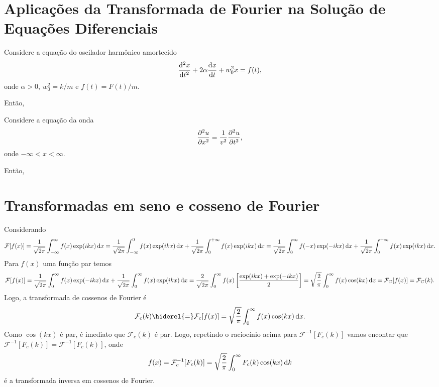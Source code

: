 \section[Aplicações na Solução de Equações Diferenciais]{Aplicações da Transformada de Fourier na Solução de Equações
Diferenciais}
\begin{exem}
  Considere a equação do oscilador harmônico amortecido
  \begin{dmath*}
    \fder{^2 x}{t^2} + 2 \alpha \fder{x}{t} + w_0^2 x = f(t),
  \end{dmath*}
  onde $\alpha > 0$, $w_0^2 = k / m$ e $f(t) = F(t) / m$.

  Então,
\end{exem}

\begin{exem}
  Considere a equação da onda
  \begin{dmath*}
    \pder{^2 u}{x^2} = \frac{1}{v^2} \pder{^2 u}{t^2},
  \end{dmath*}
  onde $-\infty < x < \infty$.

  Então,
\end{exem}

\section{Transformadas em seno e cosseno de Fourier}
Considerando
\begin{dmath*}
  \mathcal{F}[f(x)] = \frac{1}{\sqrt{2 \pi}} \int_{-\infty}^{\infty} f(x) \exp(i
  k x) \vi{x}
  = \frac{1}{\sqrt{2 \pi}} \int_{-\infty}^0 f(x) \exp(i k x) \vi{x} +
  \frac{1}{\sqrt{2 \pi}} \int_0^{+\infty} f(x) \exp(i k x) \vi{x}
  = \frac{1}{\sqrt{2 \pi}} \int_0^{\infty} f(-x) \exp(-i k x) \vi{x} +
  \frac{1}{\sqrt{2 \pi}} \int_0^{+\infty} f(x) \exp(i k x) \vi{x}.
\end{dmath*}
Para $f(x)$ uma função par temos
\begin{dmath*}
  \mathcal{F}[f(x)] = \frac{1}{\sqrt{2 \pi}} \int_0^{\infty} f(x) \exp(-i k x)
  \vi{x} + \frac{1}{\sqrt{2 \pi}} \int_0^{\infty} f(x) \exp(i k x) \vi{x}
  = \frac{2}{\sqrt{2 \pi}} \int_0^{\infty} f(x) \left[ \frac{\exp(i k x) +
  \exp(-i kx)}{2} \right]
  = \sqrt{\frac{2}{\pi}} \int_0^{\infty} f(x) \cos(k x) \vi{x}
  = \mathcal{F}_C[f(x)]
  = \mathcal{F}_C(k).
\end{dmath*}
Logo, a transformada de cossenos de Fourier é
\begin{dmath*}
  \mathcal{F}_c(k) \hiderel{=} \mathcal{F}_c[f(x)] = \sqrt{\frac{2}{\pi}}
  \int_0^{\infty} f(x) \cos(k x) \vi{x}.
\end{dmath*}
Como $\cos(k x)$ é par, é imediato que $\mathcal{F}_c(k)$ é par. Logo, repetindo
o raciocínio acima para $\mathcal{F}^{-1}[F_c(k)]$ vamos encontar que
$\mathcal{F}^{-1}[F_c(k)] = \mathcal{F}^{-1}[F_c(k)]$, onde
\begin{dmath*}
  f(x) = \mathcal{F}^{-1}_c[F_c(k)]
  = \sqrt{\frac{2}{\pi}} \int_0^{\infty} F_c(k) \cos(k x) \vi{k}
\end{dmath*}
é a transformada inversa em cossenos de Fourier.

